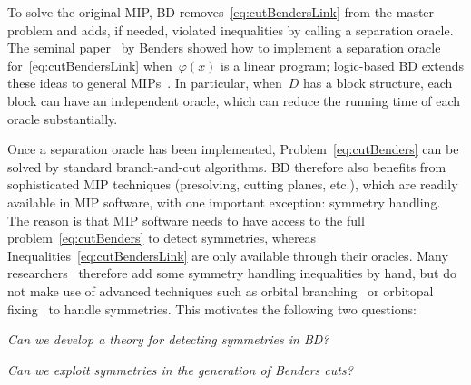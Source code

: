 \documentclass[a4paper,10pt]{article}
\theoremstyle{definition}
\begin{document}
To solve the original MIP, BD removes~\eqref{eq:cutBendersLink} from the master problem and adds, if needed, violated inequalities by calling a separation oracle.
The seminal paper~\cite{benders1962} by Benders showed how to implement a separation oracle for~\eqref{eq:cutBendersLink} when~$\varphi(x)$ is a linear program; logic-based BD extends these ideas to general MIPs~\cite{hooker2024,hooker2003logic}.
In particular, when~$D$ has a block structure, each block can have an independent oracle, which can reduce the running time of each oracle substantially. 

Once a separation oracle has been implemented, Problem~\eqref{eq:cutBenders} can be solved by standard branch-and-cut algorithms.
BD therefore also benefits from sophisticated MIP techniques (presolving, cutting planes, etc.), which are readily available in MIP software, with one important exception: symmetry handling.
The reason is that MIP software needs to have access to the full problem~\eqref{eq:cutBenders} to detect symmetries, whereas Inequalities~\eqref{eq:cutBendersLink} are only available through their  oracles.
Many researchers~\cite{adulyasakEtAl2015,akpinar2017combinatorial,delorme2017,guoEtAl2021} therefore add some symmetry handling inequalities by hand, but do not make use of advanced techniques such as orbital branching~\cite{OstrowskiEtAl2011} or orbitopal fixing~\cite{BendottiEtAl2021,DoornmalenHojny2024a,KaibelEtAl2011} to handle symmetries.
This motivates the following two questions:
%
\begin{enumerate*}[label={{(Q\arabic*)}},ref={Q\arabic*}]
\item\label{Q1} \emph{Can we develop a theory for detecting symmetries in BD?}
\item\label{Q2} \emph{Can we exploit symmetries in the generation of Benders cuts?}
\end{enumerate*}
\end{document}
